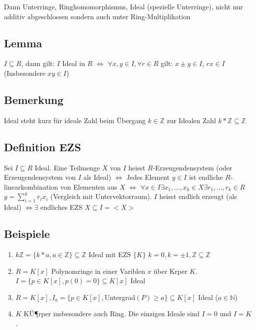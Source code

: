 \documentclass[12pt,a4paper,ngerman]{scrreprt}
\begin{document}
Dann Unterringe, Ringhomomorphismus, Ideal (spezielle Unterringe), nicht nur additiv abgeschlossen sondern auch unter Ring-Multiplikation

\subsection{Lemma}
$I \subseteq R$, dann gilt: $I$ Ideal in $R$ $\Leftrightarrow$
$\forall x,y \in I, \forall r \in R$ gilt: $x \pm y \in I$, $rx \in I$ (Insbesondere $xy \in I$)

\subsection{Bemerkung}
Ideal steht kurz für ideale Zahl beim Übergang $k \in \mathbb{Z}$ zur Idealen Zahl $k*\mathbb{Z} \subseteq \mathbb{Z}$
\subsection{Definition EZS}
Sei $I \subseteq R$ Ideal. Eine Teilmenge $X$ von $I$ heisst $R$-Erzeugendensystem (oder Erzeugendensystem von $I$ als Ideal) $\Leftrightarrow$
Jedes Element $y \in I$ ist endliche $R$-linearkombination von Elementen aus $X$ 
$\Leftrightarrow$ $\forall x \in I \exists x_1,...,x_k \in X \exists r_1,...,r_k \in R$
$y = \sum_{i=1}^k r_ix_i$ (Vergleich mit Untervektorraum). %
$I$ heisst endlich erzeugt (als Ideal) $\Leftrightarrow \exists$ endliches EZS $X \subseteq I = <X>$ %

\subsection{Beispiele}
\begin{enumerate}[(1)]
\item $k \mathbb{Z} = \{k*a, a\in \mathbb{Z} \} \subseteq \mathbb{Z}$ Ideal mit EZS $\{K\}$ %
$k = 0, k = \pm 1, \mathbb{Z} \subseteq \mathbb{Z}$
\item $R=K[x]$ Polynomringe in einer Variblen $x$ über Krper $K$. $I=\{p \in K[x], p(0)=0\} \subseteq K[x]$ Ideal
\item $R=K[x], I_a = \{p\in K[x], $Untergrad$(P) \geq a\} \subseteq K[x]$ Ideal ($a \in \mathbb{N}$)
\item $K$ KÜ¶rper insbesondere auch Ring. Die einzigen Ideale sind $I=0$ und $I=K$.
\end{enumerate}
\end{document}

